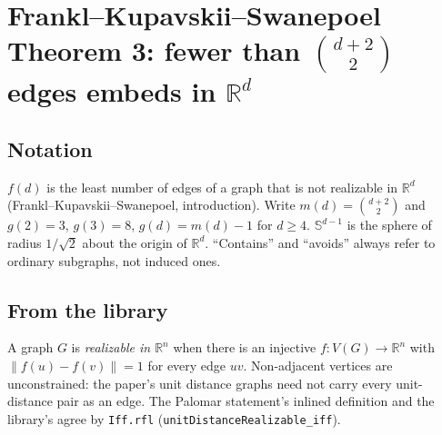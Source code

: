 %
%
%

\chapter{Frankl--Kupavskii--Swanepoel Theorem 3: fewer than $\binom{d+2}{2}$ edges embeds in $\mathbb{R}^d$}

\section{Notation}

$f(d)$ is the least number of edges of a graph that is not realizable in $\mathbb{R}^d$
(Frankl--Kupavskii--Swanepoel, introduction). Write $m(d) = \binom{d+2}{2}$ and
$g(2) = 3$, $g(3) = 8$, $g(d) = m(d) - 1$ for $d \ge 4$. $\mathbb{S}^{d-1}$ is the sphere
of radius $1/\sqrt 2$ about the origin of $\mathbb{R}^d$. ``Contains'' and ``avoids'' always
refer to ordinary subgraphs, not induced ones.

\section{From the library}

\begin{definition}
  \label{def:representable}
  \leanok
  A graph $G$ is \emph{realizable in $\mathbb{R}^n$} when there is an injective
  $f : V(G) \to \mathbb{R}^n$ with $\lVert f(u) - f(v)\rVert = 1$ for every edge $uv$.
  Non-adjacent vertices are unconstrained: the paper's unit distance graphs need not carry
  every unit-distance pair as an edge. The Palomar statement's inlined definition and the
  library's agree by \texttt{Iff.rfl} (\texttt{unitDistanceRealizable\_iff}).
\end{definition}

